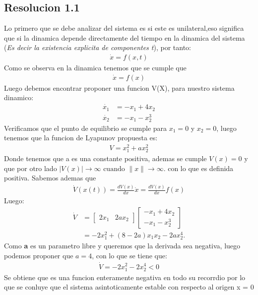 \documentclass[
  11pt,
  letterpaper,
   addpoints,
   answers
  ]{exam}
\begin{document}
\begin{questions}
\begin{solution}
    \subsection*{Resolucion 1.1}
    Lo primero que se debe analizar del sistema es si este es unilateral,eso significa que si la dinamica depende directamente del tiempo en la dinamica del sistema (\textit{Es decir la existencia explicita de componentes t}), por tanto:
    \begin{align}
        \dot{x} = f(x,t)
    \end{align}
    Como se observa en la dinamica tenemos que se cumple que 
    \begin{align}
        \dot{x} = f(x)
    \end{align}
    Luego debemos encontrar proponer una funcion V(X), para nuestro sistema dinamico:
    \begin{align}
        \dot{x_{1}} &= -x_{1} + 4x_{2}\\
        \dot{x_{2}} &= -x_{1} - x_{2}^{3}
    \end{align}
    Verificamos que el punto de equilibrio se cumple para $x_{1} = 0$ y $x_{2} = 0$, luego tenemos que la funcion de Lyapunov propuesta es:
    \begin{align}
        V=x_{1}^{2} + ax_{2}^{2} 
    \end{align}
    Donde tenemos que a es una constante positiva, ademas se cumple $V(x)=0$ y que por otro lado $|V(x)| \to \infty \text{ cuando } \|x\| \to \infty. $ con lo que es definida positiva. Sabemos ademas que 
    \begin{align}
               \dot{V}(x(t)) = \frac{dV(x)}{dx} \dot{x} = \frac{dV(x)}{dx} f(x)
    \end{align}
    Luego:
        \begin{align}
            \dot{V} &= \begin{bmatrix} 2x_1 & 2ax_2 \end{bmatrix} \begin{bmatrix} -x_1 + 4x_2 \\ -x_1 - x_2^3 \end{bmatrix} \\
            &= -2x_1^2 + (8 - 2a)x_1 x_2 - 2ax_2^4.
        \end{align}
    Como \textbf{a} es un parametro libre y queremos que la derivada sea negativa, luego podemos proponer que $a=4$, con lo que se tiene que:
    \begin{align}
        \dot{V} = -2x_{1}^{2} - 2x_{2}^{4} < 0
    \end{align}
    Se obtiene que es una funcion enteramente negativa en todo su recorrdio por lo que se conluye que el sistema asintoticamente estable con respecto al origen x = 0

\end{solution}
\end{questions}
\end{document}
